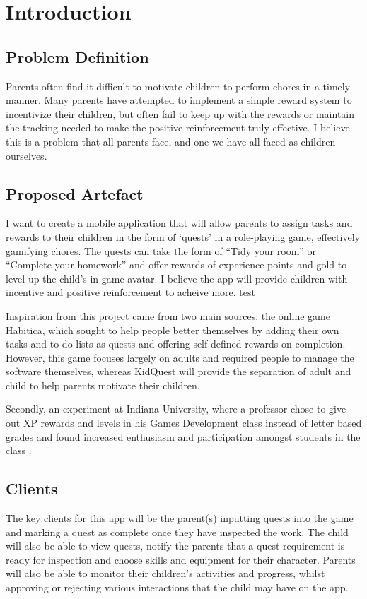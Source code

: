 \chapter{Introduction}
\label{chap:intro}

\section{Problem Definition}
Parents often find it difficult to motivate children to perform chores in a timely manner. 
Many parents have attempted to implement a simple reward system to incentivize their children, but often fail to keep up with the rewards or maintain the tracking needed to make the positive reinforcement truly effective.
I believe this is a problem that all parents face, and one we have all faced as children ourselves.  

\section{Proposed Artefact}
I want to create a mobile application that will allow parents to assign tasks and rewards to their children in the form of `quests' in a role-playing game, effectively gamifying chores. 
The quests can take the form of ``Tidy your room'' or ``Complete your homework'' and offer rewards of experience points and gold to level up the child's in-game avatar. 
I believe the app will provide children with incentive and positive reinforcement to acheive more. test

Inspiration from this project came from two main sources: the online game Habitica, which sought to help people better themselves by adding their own tasks and to-do lists as quests and offering self-defined rewards on completion. 
However, this game focuses largely on adults and required people to manage the software themselves, whereas KidQuest will provide the separation of adult and child to help parents motivate their children.

Secondly, an experiment at Indiana University, where a professor chose to give out XP rewards and levels in his Games Development class instead of letter based grades \cite{sheldon2011multiplayer}  and found increased enthusiasm and participation amongst students in the class \cite{sheldonclasspostmortem}.

\section{Clients}
The key clients for this app will be the parent(s) inputting quests into the game and marking a quest as complete once they have inspected the work. 
The child will also be able to view quests, notify the parents that a quest requirement is ready for inspection and choose skills and equipment for their character. 
Parents will also be able to monitor their children's activities and progress, whilst approving or rejecting various interactions that the child may have on the app.

